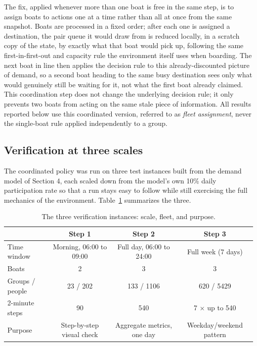\documentclass[11pt,a4paper]{article}
\begin{document}
The fix, applied whenever more than one boat is free in the same step, is to assign boats to actions one at a time rather than all at once from the same snapshot. Boats are processed in a fixed order; after each one is assigned a destination, the pair queue it would draw from is reduced locally, in a scratch copy of the state, by exactly what that boat would pick up, following the same first-in-first-out and capacity rule the environment itself uses when boarding. The next boat in line then applies the decision rule to this already-discounted picture of demand, so a second boat heading to the same busy destination sees only what would genuinely still be waiting for it, not what the first boat already claimed. This coordination step does not change the underlying decision rule; it only prevents two boats from acting on the same stale piece of information. All results reported below use this coordinated version, referred to as \emph{fleet assignment}, never the single-boat rule applied independently to a group.

\subsection{Verification at three scales}
\label{sec:escalones}

The coordinated policy was run on three test instances built from the demand model of Section 4, each scaled down from the model's own 10\% daily participation rate so that a run stays easy to follow while still exercising the full mechanics of the environment. Table~\ref{tab:escalones} summarizes the three.

\begin{table}[H]
\centering
\caption{The three verification instances: scale, fleet, and purpose.}
\label{tab:escalones}
\footnotesize
\begin{tabular}{lccc}
\toprule
 & Step 1 & Step 2 & Step 3 \\
\midrule
Time window & Morning, 06:00 to 09:00 & Full day, 06:00 to 24:00 & Full week (7 days) \\
Boats & 2 & 3 & 3 \\
Groups / people & 23 / 202 & 133 / 1106 & 620 / 5429 \\
2-minute steps & 90 & 540 & 7 $\times$ up to 540 \\
Purpose & Step-by-step visual check & Aggregate metrics, one day & Weekday/weekend pattern \\
\bottomrule
\end{tabular}
\end{table}
\end{document}
